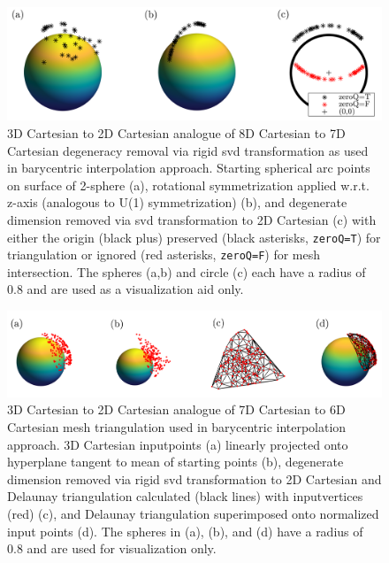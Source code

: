\documentclass[final,twocolumn,12pt]{elsarticle}
\newcommand{\inpt}{input}
\begin{document}
\begin{appendices}
\begin{figure}
    \centering
    \includegraphics[scale=1]{bary-remove-deg.png}
    \caption{3D Cartesian to 2D Cartesian analogue of 8D Cartesian to 7D Cartesian degeneracy removal via rigid \gls{svd} transformation as used in barycentric interpolation approach. Starting spherical arc points on surface of 2-sphere (a), rotational symmetrization applied w.r.t. z-axis (analogous to U(1) symmetrization) (b), and degenerate dimension removed via \acrlong{svd} transformation to 2D Cartesian (c) with either the origin (black plus) preserved (black asterisks, \texttt{zeroQ=T}) for triangulation or ignored (red asterisks, \texttt{zeroQ=F}) for mesh intersection. The spheres (a,b) and circle (c) each have a radius of 0.8 and are used as a visualization aid only.}
    \label{fig:bary-remove-deg}
\end{figure}

\begin{figure}
    \centering
    \includegraphics[scale=1]{bary-delaunay.png}
    \caption{3D Cartesian to 2D Cartesian analogue of 7D Cartesian to 6D Cartesian mesh triangulation used in barycentric interpolation approach. 3D Cartesian \inpt points (a) linearly projected onto hyperplane tangent to mean of starting points (b), degenerate dimension removed via rigid \gls{svd} transformation to 2D Cartesian and Delaunay triangulation calculated (black lines) with \inpt vertices (red) (c), and Delaunay triangulation superimposed onto normalized \inpt{} points (d). The spheres in (a), (b), and (d) have a radius of 0.8 and are used for visualization only.}
    \label{fig:bary-delaunay}
\end{figure}


\end{appendices}
\end{document}

